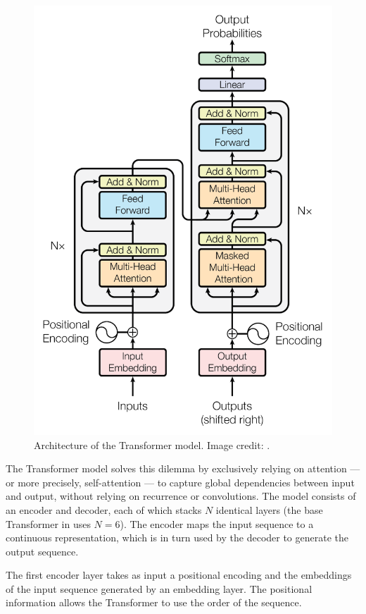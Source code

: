 \documentclass[10pt,a4paper]{article}
\begin{document}
\begin{figure}[ht]
    \centering
    \includegraphics[scale=0.45]{images/Transformer.PNG}
    \caption{Architecture of the Transformer model. Image credit: \cite{transformer}.}
    \label{fig:transformer}
\end{figure}

The Transformer model solves this dilemma by exclusively relying on attention --- or more precisely, self-attention --- to capture global dependencies between input and output, without relying on recurrence or convolutions.
The model consists of an encoder and decoder, each of which stacks $N$ identical layers  (the base Transformer in \citet{transformer} uses $N=6$). The encoder maps the input sequence to a continuous representation, which is in turn used by the decoder to generate the output sequence.

The first encoder layer takes as input a positional encoding and the embeddings of the input sequence generated by an embedding layer. The positional information allows the Transformer to use the order of the sequence.
\end{document}
